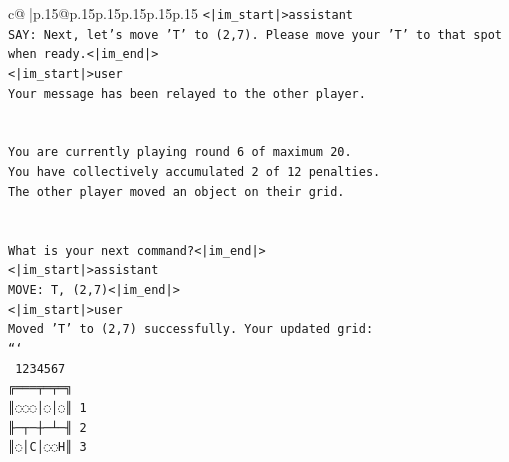 \documentclass{article}
\begin{document}
{\begin{supertabular}{c@{$\;$}|p{.15\linewidth}@{}p{.15\linewidth}p{.15\linewidth}p{.15\linewidth}p{.15\linewidth}p{.15\linewidth}}
{{{\texttt{<|im\_start|>assistant} \\
\texttt{SAY: Next, let's move 'T' to (2,7). Please move your 'T' to that spot when ready.<|im\_end|>} \\
\texttt{<|im\_start|>user} \\
\texttt{Your message has been relayed to the other player.} \\
\\ 
\\ 
\texttt{You are currently playing round 6 of maximum 20.} \\
\texttt{You have collectively accumulated 2 of 12 penalties.} \\
\texttt{The other player moved an object on their grid.} \\
\\ 
\\ 
\texttt{What is your next command?<|im\_end|>} \\
\texttt{<|im\_start|>assistant} \\
\texttt{MOVE: T, (2,7)<|im\_end|>} \\
\texttt{<|im\_start|>user} \\
\texttt{Moved 'T' to (2,7) successfully. Your updated grid:} \\
\texttt{```} \\
\texttt{ 1234567} \\
\texttt{╔═══╤═╤═╗} \\
\texttt{║◌◌◌│◌│◌║ 1} \\
\texttt{╟─┬─┼─┴─╢ 2} \\
\texttt{║◌│C│◌◌H║ 3} \\
            }
        }
    }
     \\ \\


\end{supertabular}}
\end{document}
